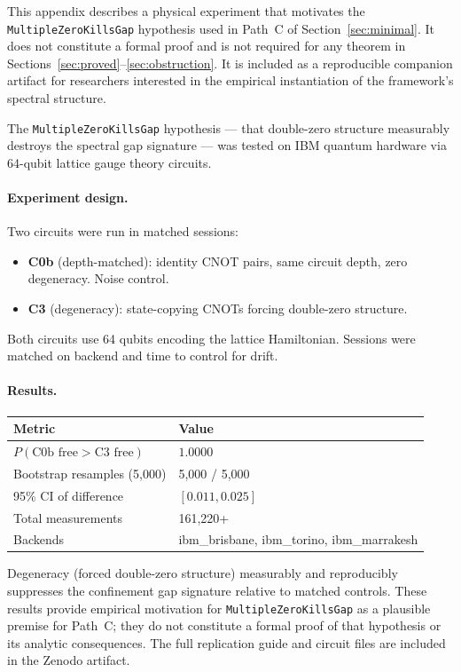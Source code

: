 \documentclass[12pt, a4paper]{article}
\theoremstyle{plain}
\theoremstyle{definition}
\newcommand{\lean}[1]{\texttt{#1}}
\begin{document}
This appendix describes a physical experiment that motivates the
\lean{MultipleZeroKillsGap} hypothesis used in Path~C of
Section~\ref{sec:minimal}.
It does not constitute a formal proof and is not required for any theorem
in Sections~\ref{sec:proved}--\ref{sec:obstruction}.
It is included as a reproducible companion artifact for researchers
interested in the empirical instantiation of the framework's spectral
structure.

The \lean{MultipleZeroKillsGap} hypothesis --- that double-zero structure
measurably destroys the spectral gap signature --- was tested on IBM quantum
hardware via 64-qubit lattice gauge theory circuits.

\paragraph{Experiment design.}
Two circuits were run in matched sessions:
\begin{itemize}[noitemsep]
  \item \textbf{C0b} (depth-matched): identity CNOT pairs, same circuit
        depth, zero degeneracy. Noise control.
  \item \textbf{C3} (degeneracy): state-copying CNOTs forcing double-zero
        structure.
\end{itemize}
Both circuits use 64 qubits encoding the lattice Hamiltonian.
Sessions were matched on backend and time to control for drift.

\paragraph{Results.}
\begin{center}
\begin{tabular}{ll}
  \toprule
  Metric & Value \\
  \midrule
  $P(\text{C0b free} > \text{C3 free})$ & $1.0000$ \\
  Bootstrap resamples (5{,}000) & 5{,}000 / 5{,}000 \\
  95\% CI of difference & $[0.011, 0.025]$ \\
  Total measurements & 161{,}220+ \\
  Backends & ibm\_brisbane, ibm\_torino, ibm\_marrakesh \\
  \bottomrule
\end{tabular}
\end{center}

Degeneracy (forced double-zero structure) measurably and reproducibly
suppresses the confinement gap signature relative to matched controls.
These results provide empirical motivation for \lean{MultipleZeroKillsGap}
as a plausible premise for Path~C; they do not constitute a formal proof
of that hypothesis or its analytic consequences.
The full replication guide and circuit files are included in the Zenodo
artifact.
\end{document}
